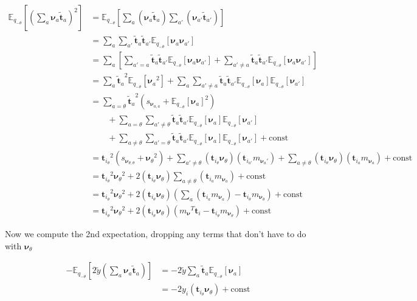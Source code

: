 \documentclass[letterpaper,12pt]{article}
\newcommand{\lp}{\left (} %
\newcommand{\rp}{\right )} %
\newcommand{\lb}{\left [} %
\newcommand{\rb}{\right ]} %
\newcommand{\nuv}{\boldsymbol{\nu}} %
\newcommand{\ti}{\boldsymbol{t}_i} %
\newcommand{\ytilde}{\ensuremath{\tilde{y}}} %
\newcommand{\ttilde}{\ensuremath{\tilde{\boldsymbol{t}}}} %
\newcommand{\mnu}{\ensuremath{m_\nuv}} %
\newcommand{\nua}{\ensuremath{\nuv_a}} %
\newcommand{\tatilde}{\ensuremath{\ttilde_a}} %
\newcommand{\nuaprime}{\ensuremath{\nuv_{a'}}} %
\newcommand{\taprimetilde}{\ensuremath{\ttilde_{a'}}} %
\newcommand{\tia}{\ensuremath{\boldsymbol{t}_{i_a}}} %
\newcommand{\tiaprime}{\ensuremath{\boldsymbol{t}_{i_{a'}}}} %
\newcommand{\tthetatilde}{\ensuremath{\boldsymbol{t}_{i_\theta}}} %
\newcommand{\nutheta}{\ensuremath{\nuv_\theta}} %
\newcommand{\mnusub}[1]{\ensuremath{m_{\nuv_#1}}} %
\newcommand{\snusub}[1]{\ensuremath{s_{\nuv_#1}}} %
\newcommand{\Etheta}{\ensuremath{\mathbb{E}_{q_{-\theta}}}} %
\begin{document}
\begin{equation}
\begin{split}
    \Etheta \lb \lp \sum_a \nua \tatilde \rp^2 \rb &= \Etheta \lb \sum_a  \lp \nua \tatilde \rp \sum_{a'} \lp \nuaprime \taprimetilde \rp \rb \\
    &= \sum_a \sum_{a'} \tatilde \taprimetilde \Etheta \lb \nua \nuaprime \rb \\
    &= \sum_a \lb \sum_{a' = a} \tatilde \taprimetilde \Etheta \lb \nua \nuaprime \rb + \sum_{a' \neq a} \tatilde \taprimetilde \Etheta \lb \nua \nuaprime \rb \rb \\
    &= \sum_a \tatilde^2 \Etheta \lb \nua^2 \rb + \sum_a \sum_{a' \neq a} \tatilde \taprimetilde \Etheta \lb \nua \rb \Etheta \lb \nuaprime \rb  \\
    &= \sum_{a=\theta} \tatilde^2 \lp \snusub{{a, a}} + \Etheta \lb \nua \rb^2 \rp \\
    & \qquad + \sum_{a=\theta} \sum_{a' \neq \theta} \tatilde \taprimetilde \Etheta \lb \nua \rb \Etheta \lb \nuaprime \rb\\
    & \qquad + \sum_{a \neq \theta} \sum_{a' = \theta} \tatilde \taprimetilde \Etheta \lb \nua \rb \Etheta \lb \nuaprime \rb  + \text{const} \\
    &= \tthetatilde^2 \lp \snusub{{\theta, \theta}} + \nutheta^2 \rp + \sum_{a' \neq \theta} \lp \tthetatilde \nutheta \rp \lp \tiaprime \mnusub{a'} \rp + \sum_{a \neq \theta} \lp \tthetatilde \nutheta \rp \lp \tia \mnusub{a} \rp + \text{const} \\
    &= \tthetatilde^2 \nutheta^2 + 2 \lp \tthetatilde \nutheta \rp \sum_{a \neq \theta} \lp \tia \mnusub{a} \rp + \text{const} \\
    &= \tthetatilde^2 \nutheta^2 + 2 \lp \tthetatilde \nutheta \rp \lp \sum_{a} \lp \tia \mnusub{a} \rp - \ti_\theta \mnusub{\theta}  \rp + \text{const} \\
    &= \tthetatilde^2 \nutheta^2 + 2 \lp \tthetatilde \nutheta \rp \lp {\mnu}^T \ti - \ti_\theta \mnusub{\theta}  \rp + \text{const} 
\end{split}
\end{equation}

Now we compute the 2nd expectation, dropping any terms that don't have to do with $\nuv_\theta$

\begin{equation}
\begin{split}
    - \Etheta \lb 2 \ytilde \lp \sum_a \nua \tatilde \rp \rb &= -2 \ytilde \sum_a \tatilde \Etheta \lb \nua \rb \\
    &= -2 y_i \lp \tthetatilde \nutheta \rp + \text{const}
\end{split}
\end{equation}
\end{document}

